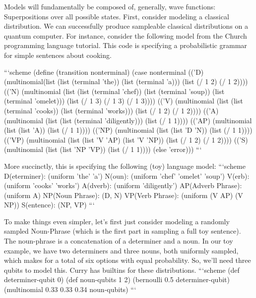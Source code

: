 \documentclass[journal]{article}
\begin{document}
 Models will fundamentally be composed of, generally, wave functions: Superpositions over all possible states.
 First, consider modeling a classical distribution. 
 We can successfully produce sampleable classical distributions on a quantum computer.
 For instance, consider the following model from the Church programming language tutorial.
 This code is specifying a probabilistic grammar for simple sentences about cooking.
 
 ```scheme
 (define (transition nonterminal)
   (case nonterminal
         (('D) (multinomial(list (list (terminal 'the))
                                 (list (terminal 'a)))
                           (list (/ 1 2) (/ 1 2))))
         (('N) (multinomial (list (list (terminal 'chef))
                                  (list (terminal 'soup))
                                  (list (terminal 'omelet)))
                            (list (/ 1 3) (/ 1 3) (/ 1 3))))
         (('V) (multinomial (list (list (terminal 'cooks))
                                  (list (terminal 'works)))
                            (list (/ 1 2) (/ 1 2))))
         (('A) (multinomial (list (list (terminal 'diligently)))
                            (list (/ 1 1))))
         (('AP) (multinomial (list (list 'A))
                             (list (/ 1 1))))
         (('NP) (multinomial (list (list 'D 'N))
                             (list (/ 1 1))))
         (('VP) (multinomial (list (list 'V 'AP)
                                   (list 'V 'NP))
                             (list (/ 1 2) (/ 1 2))))
         (('S) (multinomial (list (list 'NP 'VP))
                            (list (/ 1 1))))
         (else 'error)))
 ```
 
 More succinctly, this is specifying the following (toy) language model:
 ```scheme
 D(eterminer):      (uniform 'the' 'a')
 N(oun):            (uniform 'chef' 'omelet' 'soup')
 V(erb):            (uniform 'cooks' 'works')
 A(dverb):          (uniform 'diligently')
 AP(Adverb Phrase): (uniform A)
 NP(Noun Phrase):   (D, N)
 VP(Verb Phrase):   (uniform (V AP) (V NP))
 S(entence):        (NP, VP)
 ```
 
 To make things even simpler, let's first just consider modeling a randomly sampled Noun-Phrase (which is the first part in sampling a full toy sentence).
 The noun-phrase is a concatenation of a determiner and a noun. In our toy example, we have two determiners and three nouns, both uniformly sampled, which makes for a total of six options with equal probability.
 So, we'll need three qubits to model this. Curry has builtins for these distributions.
 ```scheme
 (def determiner-qubit 0)
 (def noun-qubits 1 2)
 (bernoulli 0.5 determiner-qubit)
 (multinomial 0.33 0.33 0.34 noun-qubits)
 ```
 
\end{document}
